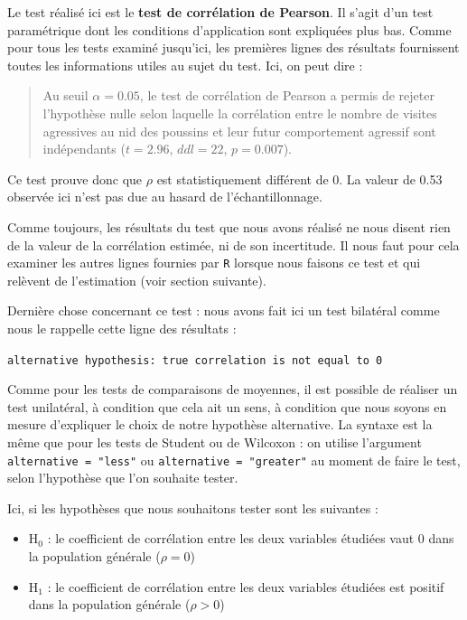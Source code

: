 \documentclass[a4paperpaper,]{article}
\providecommand{\tightlist}{%
  \setlength{\itemsep}{0pt}\setlength{\parskip}{0pt}}
\begin{document}
Le test réalisé ici est le \textbf{test de corrélation de Pearson}. Il s'agit d'un test paramétrique dont les conditions d'application sont expliquées plus bas. Comme pour tous les tests examiné jusqu'ici, les premières lignes des résultats fournissent toutes les informations utiles au sujet du test. Ici, on peut dire :

\begin{quote}
Au seuil \(\alpha = 0.05\), le test de corrélation de Pearson a permis de rejeter l'hypothèse nulle selon laquelle la corrélation entre le nombre de visites agressives au nid des poussins et leur futur comportement agressif sont indépendants (\(t = 2.96\), \(ddl = 22\), \(p = 0.007\)).
\end{quote}

Ce test prouve donc que \(\rho\) est statistiquement différent de 0. La valeur de 0.53 observée ici n'est pas due au hasard de l'échantillonnage.

Comme toujours, les résultats du test que nous avons réalisé ne nous disent rien de la valeur de la corrélation estimée, ni de son incertitude. Il nous faut pour cela examiner les autres lignes fournies par \texttt{R} lorsque nous faisons ce test et qui relèvent de l'estimation (voir section suivante).

Dernière chose concernant ce test : nous avons fait ici un test bilatéral comme nous le rappelle cette ligne des résultats :

\texttt{alternative\ hypothesis:\ true\ correlation\ is\ not\ equal\ to\ 0}

Comme pour les tests de comparaisons de moyennes, il est possible de réaliser un test unilatéral, à condition que cela ait un sens, à condition que nous soyons en mesure d'expliquer le choix de notre hypothèse alternative. La syntaxe est la même que pour les tests de Student ou de Wilcoxon : on utilise l'argument \texttt{alternative\ =\ "less"} ou \texttt{alternative\ =\ "greater"} au moment de faire le test, selon l'hypothèse que l'on souhaite tester.

Ici, si les hypothèses que nous souhaitons tester sont les suivantes :

\begin{itemize}
\tightlist
\item
  H\(_0\) : le coefficient de corrélation entre les deux variables étudiées vaut 0 dans la population générale (\(\rho = 0\))
\item
  H\(_1\) : le coefficient de corrélation entre les deux variables étudiées est positif dans la population générale (\(\rho > 0\))
\end{itemize}
\end{document}
